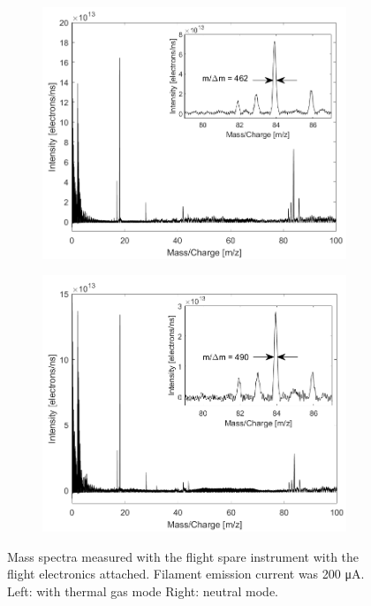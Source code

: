		\begin{figure}[h]
			\begin{subfigure}{0.5\textwidth}
				\centering
				\includegraphics[width = \textwidth]{Experiments/FSthMode200uA.png}
			\end{subfigure}
			\begin{subfigure}{0.5\textwidth}
				\centering
				\includegraphics[width = \textwidth]{Experiments/FSnMode200uA.png}
			\end{subfigure}
			\caption{Mass spectra measured with the flight spare instrument with the flight electronics attached. Filament emission current was 200 \si{\micro\ampere}. Left: with thermal gas mode Right: neutral mode.}
			\label{fig:ExpFSFlightElMassRes}
		\end{figure}
		
